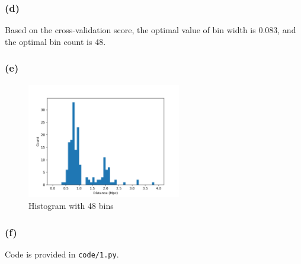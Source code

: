 \subsubsection*{(d)}
Based on the cross-validation score, the optimal value of bin width is 0.083, and the optimal bin count is 48.

\subsubsection*{(e)}
\vspace{-30pt}
\begin{figure}[H]
	\centering
	\includegraphics[width=0.6\textwidth]{images/1/optimalhistogram.png}
	\caption{Histogram with 48 bins}
\end{figure}

\subsubsection*{(f)}
Code is provided in \texttt{code/1.py}.
